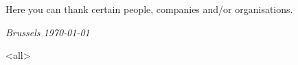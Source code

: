     { %
        \def\AcknowledgementsName{Acknowledgements}
    } 
    { %
        \def\AcknowledgementsName{Dankwoord}
    }

\chapter*{\AcknowledgementsName}

\begin{explanation}
    Here you can thank certain people, companies and/or organisations.
\end{explanation}


\vspace{7 cm} %

\hfill \vubstudent %

\hfill\textit{Brussels \today}

\mode<all> %